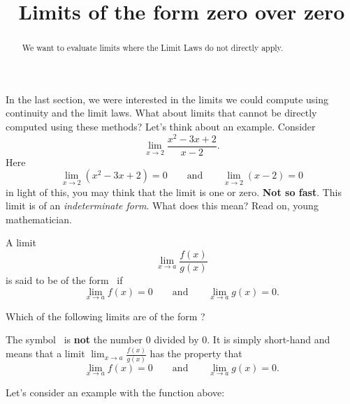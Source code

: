 \documentclass{ximera}
\title[Dig-In:]{Limits of the form zero over zero}
\begin{document}
\begin{abstract}
  We want to evaluate limits where the Limit Laws do not directly apply. 
\end{abstract}

\maketitle

In the last section, we were interested in the limits we could compute
using continuity and the limit laws. What about limits that cannot be
directly computed using these methods? Let's think about an example. Consider
\[
\lim_{x\to 2}\frac{x^2-3x+2}{x-2}.
\]
Here 
\[
\lim_{x\to 2}\left(x^2-3x+2\right) = 0\qquad\text{and}\qquad \lim_{x\to
  2}\left(x-2\right) = 0
\]
in light of this, you may think that the limit is one or
zero. \textbf{Not so fast}. This limit is of an \textit{indeterminate
  form}. What does this mean? Read on, young mathematician.

\begin{definition}
  A limit
  \[
  \lim_{x\to a} \frac{f(x)}{g(x)}
  \]
  is said to be of the form \zeroOverZero\ if
  \[
  \lim_{x\to a} f(x) = 0\qquad\text{and}\qquad \lim_{x\to a} g(x) = 0.
  \]
\end{definition}

\begin{problem}
  Which of the following limits are of the form \zeroOverZero?
  \begin{selectAll}
  \end{selectAll}
\end{problem}

\begin{warning}
  The symbol \zeroOverZero\ is \textbf{not} the number $0$ divided by
  $0$. It is simply short-hand and means that a limit $\lim_{x\to a}
  \frac{f(x)}{g(x)}$ has the property that
  \[
  \lim_{x\to a} f(x) = 0\qquad\text{and}\qquad \lim_{x\to a} g(x) =0.
  \]
\end{warning}


Let's consider an example with the function above:
\end{document}
